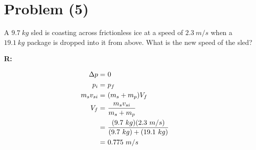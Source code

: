 \section{Problem (5)}
	A $9.7 \ kg$ sled is coasting across frictionless ice at a speed of $2.3 \ m/s$ when a $19.1 \ kg$ package is dropped into it from above. What is the new speed of the sled?

	\textbf{R:}

	\begin{align}
		\Delta p = \ &0& \notag \\
		p_{i} = \ &p_{f}& \notag \\
		m_{s}v_{si} = \ &(m_{s} + m_{p})V_{f}& \notag \\
		V_{f} = \ &\frac{m_{s}v_{si}}{m_{s} + m_{p}}& \notag \\
		= \ &\frac{(9.7 \ kg)(2.3 \ m/s)}{(9.7 \ kg) + (19.1 \ kg)}& \notag \\
		= \ &0.775 \ m/s&
	\end{align}
